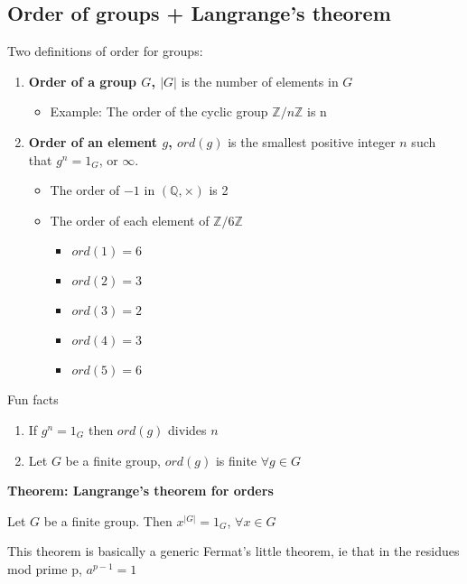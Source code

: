 \documentclass{article}
\begin{document}
\subsection{Order of groups + Langrange's theorem}
Two definitions of order for groups:
\begin{enumerate}
	\item \textbf{Order of a group $G$, $|G|$} is the number of elements in $G$
		\begin{itemize}
			\item Example: The order of the cyclic group $\mathbb{Z}/n\mathbb{Z}$ is n
		\end{itemize}
	\item \textbf{Order of an element $g$, $ord(g)$} is the smallest positive integer $n$ such that $g^n = 1_G$, or $\infty$.
		\begin{itemize}
			\item The order of $-1$ in $(\mathbb{Q},\times)$ is 2
			\item The order of each element of $\mathbb{Z}/6\mathbb{Z}$
			\begin{itemize}
				\item $ord(1) = 6$
				\item $ord(2) = 3$
				\item $ord(3) = 2$
				\item $ord(4) = 3$
				\item $ord(5) = 6$
			\end{itemize}
		\end{itemize}
\end{enumerate}
Fun facts
\begin{enumerate}
	\item If $g^n = 1_G$ then $ord(g)$ divides $n$
	\item Let $G$ be a finite group, $ord(g)$ is finite $\forall g \in G$
\end{enumerate}
\textbf{Theorem: Langrange's theorem for orders}
\begin{framed}
	Let $G$ be a finite group. Then $x^{|G|} = 1_G$, $\forall x \in G$ 
\end{framed}
This theorem is basically a generic Fermat's little theorem, ie that in the residues mod prime p, $a^{p-1} = 1$
\end{document}
